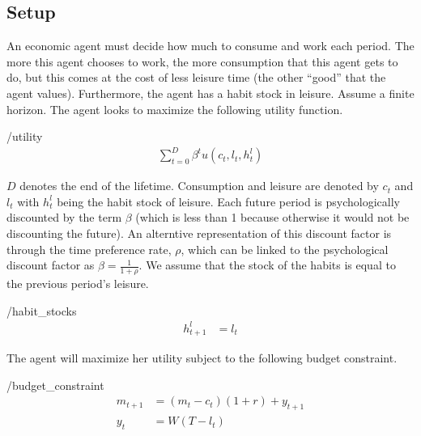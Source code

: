 \documentclass[ProjectMMD]{subfiles}
\begin{document}
\subsection{Setup}\label{subsec:Setup}
An economic agent must decide how much to consume and work each period. The more this agent chooses to work, the more consumption that this agent gets to do, but this comes at the cost of less leisure time (the other ``good'' that the agent values). Furthermore, the agent has a habit stock in leisure. Assume a finite horizon. The agent looks to maximize the following utility function.
\hypertarget{utility}{}
\begin{verbatimwrite}{\EqDir/utility}
  \begin{align}
    \sum_{t=0}^{D}\beta^t u(c_t, l_t, h_t^l)
  \end{align}
\end{verbatimwrite}


$D$ denotes the end of the lifetime. Consumption and leisure are denoted by $c_t$ and $l_t$ with $h_t^l$ being the habit stock of leisure. Each future period is psychologically discounted by the term $\beta$ (which is less than 1 because otherwise it would not be discounting the future). An alterntive representation of this discount factor is through the time preference rate, $\rho$, which can be linked to the psychological discount factor as $\beta = \frac{1}{1+\rho}$. We assume that the stock of the habits is equal to the previous period's leisure.

\hypertarget{habit_stocks}{}
\begin{verbatimwrite}{\EqDir/habit_stocks}
	\begin{align}
		h_{t+1}^l & = l_t \label{eq:habit}	
	\end{align}
\end{verbatimwrite}


The agent will maximize her utility subject to the following budget constraint.
\hypertarget{budget_constraint}{}
\begin{verbatimwrite}{\EqDir/budget_constraint}
  \begin{align}
    m_{t+1} & = (m_t -c_t)(1+r) + y_{t+1} \label{eq:savings} \\
    y_t &= W(T-l_t) \label{eq:earnings}
  \end{align}
\end{verbatimwrite}

\end{document}
